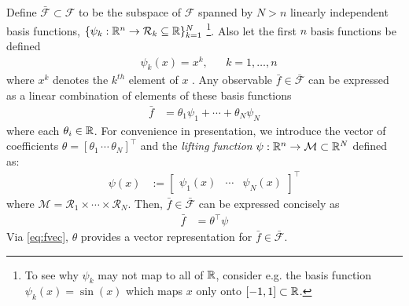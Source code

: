 Define ${\bar{\mathcal{F}} \subset \mathcal{F}}$ to be the subspace of $\mathcal{F}$ spanned by ${N>n}$ linearly independent basis functions, 
${ \{ \psi_k : \mathbb{R}^n \to \mathcal{R}_k \subseteq \mathbb{R} \}_{k=1}^N}$ 
\footnote{To see why $\psi_k$ may not map to all of $\mathbb{R}$, consider e.g. the basis function $\psi_k(x) = \sin{(x)}$ which maps $x$ only onto $[-1,1] \subset \mathbb{R}$.}.
Also let the first $n$ basis functions be defined
\begin{align}
    &\psi_k(x) = x^k , && k = 1, \dots , n
    \label{eq:xinpsi}
\end{align}
where $x^k$ denotes the $k^{th}$ element of $x$ .
Any observable $\bar{f} \in \bar{\mathcal{F}}$ can be expressed as a linear combination of elements of these basis functions
\begin{align}
    \bar{f} &= \theta_1 \psi_1 + \cdots + \theta_N \psi_N
\end{align}
where each $\theta_i \in \mathbb{R}$.
For convenience in presentation, we introduce the vector of coefficients ${\theta = [ \theta_1 \,  \cdots \, \theta_N ]^\top}$ and the \emph{lifting function} ${\psi : \mathbb{R}^n \to \mathcal{M} \subset \mathbb{R}^N}$ defined as:
\begin{align}
    \psi(x) &:= \begin{bmatrix} \psi_1 (x) & \cdots & \psi_N (x) \end{bmatrix}^\top
    \label{eq:lift}
\end{align}
where $\mathcal{M} = \mathcal{R}_1 \times \cdots \times \mathcal{R}_N$.
Then, $\bar{f} \in \bar{\mathcal{F}}$ can be expressed concisely as
\begin{align}
    \bar{f} &= \theta^\top \psi
    \label{eq:fvec}
\end{align}
Via \eqref{eq:fvec}, $\theta$ provides a vector representation for $\bar{f} \in \bar{\mathcal{F}}$.

